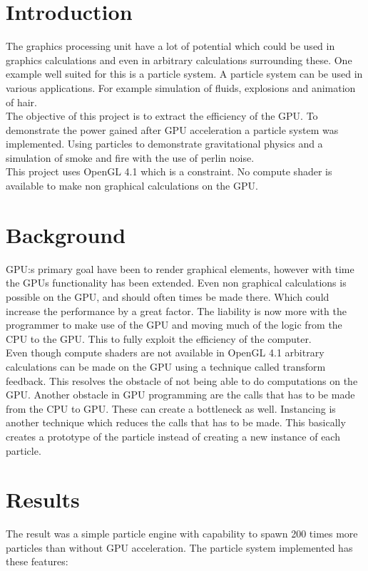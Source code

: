 \documentclass[report]{vgtc}
\begin{document}
\section{Introduction}
The graphics processing unit have a lot of potential which could be used in graphics calculations and even in arbitrary calculations surrounding these. One example well suited for this is a particle system. A particle system can be used in various applications. For example simulation of fluids, explosions and animation of hair. 
\\
The objective of this project is to extract the efficiency of the GPU. To demonstrate the power gained after GPU acceleration a particle system was implemented. Using particles to demonstrate gravitational physics and a simulation of smoke and fire with the use of perlin noise.
\\
This project uses OpenGL 4.1 which is a constraint. No compute shader is available to make non graphical calculations on the GPU. 

\section{Background}
GPU:s primary goal have been to render graphical elements, however with time the GPUs functionality has been extended. Even non graphical calculations is possible on the GPU, and should often times be made there. Which could increase the performance by a great factor. The liability is now more with the programmer to make use of the GPU and moving much of the logic from the CPU to the GPU. This to fully exploit the efficiency of the computer.
\\
Even though compute shaders are not available in OpenGL 4.1 arbitrary calculations can be made on the GPU using a technique called transform feedback. This resolves the obstacle of not being able to do computations on the GPU. Another obstacle in GPU programming are the calls that has to be made from the CPU to GPU. These can create a bottleneck as well. Instancing is another technique which reduces the calls that has to be made. This basically creates a prototype of the particle instead of creating a new instance of each particle.

\section{Results}

The result was a simple particle engine with capability to spawn 200 times more particles than without GPU acceleration. The particle system implemented has these features:
\end{document}
